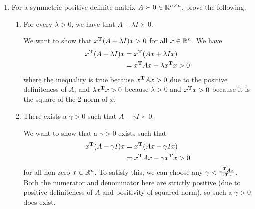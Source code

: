 \begin{enumerate}[label=(\alph*)]
    \item For a symmetric positive definite matrix $A \succ 0 \in \mathbb{R}^{n\times n}$, prove the following.
    \begin{enumerate}[label=(\roman*)]
        \item For every $\lambda > 0$, we have that $A + \lambda I \succ 0$.
          \begin{mdframed}
            We want to show that $x^{\mathbf{T}}(A + \lambda I) x > 0$ for all $x \in \mathbb{R}^n$. We have
            \begin{align*}
              x^{\mathbf{T}}(A + \lambda I) x
              &= x^{\mathbf{T}}(Ax + \lambda Ix) \\
              &= x^{\mathbf{T}} Ax + \lambda x^{\mathbf{T}} x > 0
            \end{align*}
            where the inequality is true because $x^{\mathbf{T}} Ax > 0$ due to the
            positive definiteness of $A$, and $\lambda x^{\mathbf{T}} x > 0$ because
            $\lambda > 0$ and $x^{\mathbf{T}} x > 0$ because it is the square of the
            2-norm of $x$.
          \end{mdframed}
        \item There exists a $\gamma > 0$ such that $A - \gamma I \succ 0$.
          \begin{mdframed}
            We want to show that a $\gamma > 0$ exists such that
            \begin{align*}
              x^{\mathbf{T}}(A - \gamma I) x
              &= x^{\mathbf{T}}(Ax - \gamma Ix) \\
              &= x^{\mathbf{T}} Ax - \gamma x^{\mathbf{T}} x > 0
            \end{align*}
            for all non-zero $x \in \mathbb{R}^n$. To satisfy this, we can choose any
            $\gamma < \frac{x^{\mathbf{T}} Ax}{x^{\mathbf{T}} x}$. Both the numerator and
            denominator here are strictly positive (due to positive
            definiteness of $A$ and positivity of squared norm), so such a
            $\gamma > 0$ does exist.

\end{mdframed}
\end{enumerate}
\end{enumerate}
